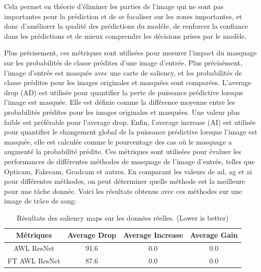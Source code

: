 Cela permet en théorie d'éliminer les parties de l'image qui ne sont pas importantes pour la prédiction et de se focaliser sur les zones importantes, et
donc d'améliorer la qualité des prédictions du modèle, de renforcer la confiance dans les prédictions et de mieux comprendre les décisions prises par le modèle.

Plus précisement, ces métriques sont utilisées pour mesurer l'impact du masquage sur les probabilités de classe prédites d'une image d'entrée. Plus précisément, l'image d'entrée est masquée avec une carte de saliency, et les probabilités de classe prédites pour les images originales et masquées sont comparées.
L'average drop (AD) est utilisée pour quantifier la perte de puissance prédictive lorsque l'image est masquée. Elle est définie comme la différence moyenne entre les probabilités prédites pour les images originales et masquées. Une valeur plus faible est préférable pour l'average drop.
Enfin, l'average increase (AI) est utilisée pour quantifier le changement global de la puissance prédictive lorsque l'image est masquée, elle est calculée comme le pourcentage des cas où le masquage a augmenté la probabilité prédite. 
Ces métriques sont utilisées pour évaluer les performances de différentes méthodes de masquage de l'image d'entrée, telles que Opticam, Fakecam, Gradcam et autres. En comparant les valeurs de ad, ag et ai pour différentes méthodes, on peut déterminer quelle méthode est la meilleure pour une tâche donnée.
Voici les résultats obtenus avec ces méthodes sur une image de trâce de sang:

\begin{table}[ht]
    \centering
    \begin{tabular}{cccc}
        \toprule
        Métriques & Average Drop & Average Increase & Average Gain \\
        \midrule
        AWL ResNet & 91.6 & 0.0& 0.0\\
        FT AWL ResNet & 87.6 & 0.0 & 0.0\\
        \bottomrule
        \end{tabular}
    \caption{Résultats des saliency maps sur les données réelles. (Lower is better)}
    \label{tab:saliency_results}
\end{table}
